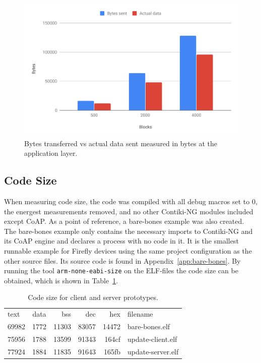 \documentclass[0-thesis.tex]{subfiles}
\begin{document}
\begin{figure}[h!]
    \caption{Bytes transferred vs actual data sent measured in bytes at the application layer.}
    \label{fig:communication-overhead}
    \includegraphics[scale=0.65]{images/communication-overhead.pdf}
\end{figure}

\subsection{Code Size}
\label{ssec:code-size}
When measuring code size, the code was compiled with all debug macros set to 0, the
energest measurements removed, and no other Contiki-NG modules included except CoAP. As a
point of reference, a bare-bones example was also created. The bare-bones example only
contains the necessary imports to Contiki-NG and its CoAP engine and declares a process
with no code in it. It is the smallest runnable example for Firefly devices using the same
project configuration as the other source files. Its source code is found in
Appendix~\ref{app:bare-bones}. By running the tool \texttt{arm-none-eabi-size} on the
ELF-files the code size can be obtained, which is shown in Table~\ref{tab:code-size}.

\begin{table}[!t]
\begin{tabular}{l c r r r l}
text	&  data	 &  bss	 &  dec	 &  hex&filename\\
69982	&  1772	 &11303	 &83057	 &14472&bare-bones.elf\\
75956	&  1788	 &13599	 &91343	 &164cf&update-client.elf\\
77924	&  1884	 &11835	 &91643	 &165fb&update-server.elf
\end{tabular}
\caption{Code size for client and server prototypes.}
\label{tab:code-size}
\end{table}
\end{document}
